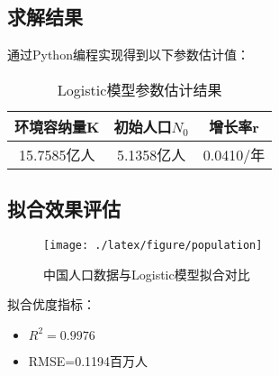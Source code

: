\subsection{求解结果}
通过Python编程实现得到以下参数估计值：
\begin{table}[htbp]
\centering
\caption{Logistic模型参数估计结果}
\begin{tabular}{ccc}
\toprule
\textbf{环境容纳量K} & \textbf{初始人口$N_0$} & \textbf{增长率r} \\
\midrule
15.7585亿人 &5.1358亿人 &0.0410/年 \\
\bottomrule
\end{tabular}
\end{table}

\subsection{拟合效果评估}
\begin{figure}[htbp]
\centering
\texttt{[image: ./latex/figure/population]}
\caption{中国人口数据与Logistic模型拟合对比}
\end{figure}

拟合优度指标：
\begin{itemize}
\item $R^2=0.9976$
\item RMSE=0.1194百万人
\end{itemize}
